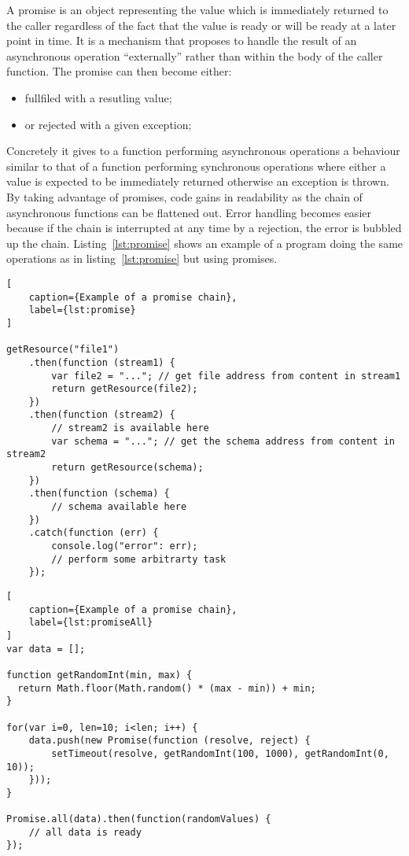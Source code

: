 A promise is an object representing the value which is immediately returned to the caller regardless of the fact that the value is ready or will be ready at a later point in time. It is a mechanism that proposes to handle the result of an asynchronous operation ``externally'' rather than within the body of the caller function. The promise can then become either:
\begin{itemize}
    \item fullfiled with a resutling value;
    \item or rejected with a given exception;
\end{itemize}

Concretely it gives to a function performing asynchronous operations a behaviour similar to that of a function performing synchronous operations where either a value is expected to be immediately returned otherwise an exception is thrown. By taking advantage of promises, code gains in readability as the chain of asynchronous functions can be flattened out. Error handling becomes easier because if the chain is interrupted at any time by a rejection, the error is bubbled up the chain. Listing~\ref{lst:promise} shows an example of a program doing the same operations as in listing~\ref{lst:promise} but using promises.

\begin{lstlisting}[
    caption={Example of a promise chain},
    label={lst:promise}
]

getResource("file1")
    .then(function (stream1) {
        var file2 = "..."; // get file address from content in stream1
        return getResource(file2);
    })
    .then(function (stream2) {
        // stream2 is available here
        var schema = "..."; // get the schema address from content in stream2
        return getResource(schema);
    })
    .then(function (schema) {
        // schema available here
    })
    .catch(function (err) {
        console.log("error": err);
        // perform some arbitrarty task
    });

\end{lstlisting}


\begin{lstlisting}[
    caption={Example of a promise chain},
    label={lst:promiseAll}
]
var data = [];

function getRandomInt(min, max) {
  return Math.floor(Math.random() * (max - min)) + min;
}

for(var i=0, len=10; i<len; i++) {
    data.push(new Promise(function (resolve, reject) {
        setTimeout(resolve, getRandomInt(100, 1000), getRandomInt(0, 10));
    }));
}

Promise.all(data).then(function(randomValues) {
    // all data is ready
});

\end{lstlisting}

